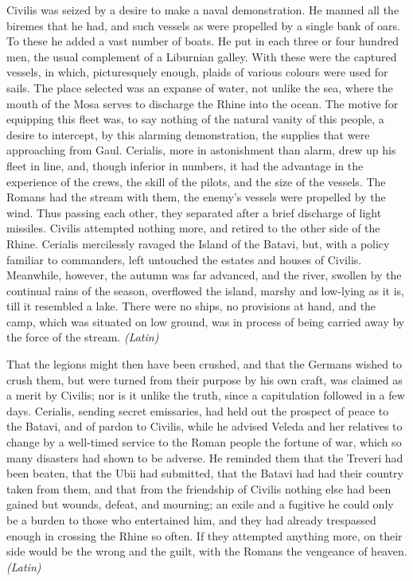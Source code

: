 
Civilis was seized by a desire to make a naval demonstration. He manned all the biremes that he had, and such vessels as were propelled by a single bank of oars. To these he added a vast number of boats. He put in each three or four hundred men, the usual complement of a Liburnian galley. With these were the captured vessels, in which, picturesquely enough, plaids of various colours were used for sails. The place selected was an expanse of water, not unlike the sea, where the mouth of the Mosa serves to discharge the Rhine into the ocean. The motive for equipping this fleet was, to say nothing of the natural vanity of this people, a desire to intercept, by this alarming demonstration, the supplies that were approaching from Gaul. Cerialis, more in astonishment than alarm, drew up his fleet in line, and, though inferior in numbers, it had the advantage in the experience of the crews, the skill of the pilots, and the size of the vessels. The Romans had the stream with them, the enemy's vessels were propelled by the wind. Thus passing each other, they separated after a brief discharge of light missiles. Civilis attempted nothing more, and retired to the other side of the Rhine. Cerialis mercilessly ravaged the Island of the Batavi, but, with a policy familiar to commanders, left untouched the estates and houses of Civilis. Meanwhile, however, the autumn was far advanced, and the river, swollen by the continual rains of the season, overflowed the island, marshy and low-lying as it is, till it resembled a lake. There were no ships, no provisions at hand, and the camp, which was situated on low ground, was in process of being carried away by the force of the stream. \emph{(Latin)}


That the legions might then have been crushed, and that the Germans wished to crush them, but were turned from their purpose by his own craft, was claimed as a merit by Civilis; nor is it unlike the truth, since a capitulation followed in a few days. Cerialis, sending secret emissaries, had held out the prospect of peace to the Batavi, and of pardon to Civilis, while he advised Veleda and her relatives to change by a well-timed service to the Roman people the fortune of war, which so many disasters had shown to be adverse. He reminded them that the Treveri had been beaten, that the Ubii had submitted, that the Batavi had had their country taken from them, and that from the friendship of Civilis nothing else had been gained but wounds, defeat, and mourning; an exile and a fugitive he could only be a burden to those who entertained him, and they had already trespassed enough in crossing the Rhine so often. If they attempted anything more, on their side would be the wrong and the guilt, with the Romans the vengeance of heaven. \emph{(Latin)}

